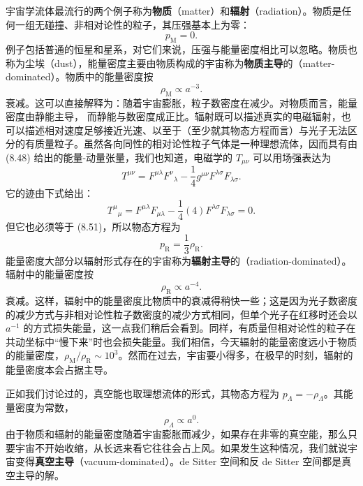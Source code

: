 宇宙学流体最流行的两个例子称为\textbf{物质}（matter）和\textbf{辐射}（radiation）。物质是任何一组无碰撞、非相对论性的粒子，其压强基本上为零：
\begin{equation*}
p_{\mathrm{M}} = 0.
\tag{8.57}
\end{equation*}
例子包括普通的恒星和星系，对它们来说，压强与能量密度相比可以忽略。物质也称为尘埃（dust），能量密度主要由物质构成的宇宙称为\textbf{物质主导}的（matter-dominated）。物质中的能量密度按
\begin{equation*}
\rho_{\mathrm{M}} \propto a^{-3}.
\tag{8.58}
\end{equation*}
衰减。这可以直接解释为：随着宇宙膨胀，粒子数密度在减少。对物质而言，能量密度由静能主导，
而静能与数密度成正比。辐射既可以描述真实的电磁辐射，也可以描述相对速度足够接近光速、以至于（至少就其物态方程而言）与光子无法区分的有质量粒子。虽然各向同性的相对论性粒子气体是一种理想流体，因而具有由 (8.48) 给出的能量-动量张量，我们也知道，电磁学的 $T_{\mu\nu}$ 可以用场强表达为
\begin{equation*}
T^{\mu\nu} = F^{\mu\lambda}F^{\nu}{}_{\lambda} - \frac{1}{4}g^{\mu\nu}F^{\lambda\sigma}F_{\lambda\sigma}.
\tag{8.59}
\end{equation*}
它的迹由下式给出：
\begin{equation*}
T^\mu{}_\mu = F^{\mu\lambda}F_{\mu\lambda} - \frac{1}{4}(4)F^{\lambda\sigma}F_{\lambda\sigma} = 0.
\tag{8.60}
\end{equation*}
但它也必须等于 (8.51)，所以物态方程为
\begin{equation*}
p_{\mathrm{R}} = \frac{1}{3}\rho_{\mathrm{R}}.
\tag{8.61}
\end{equation*}
能量密度大部分以辐射形式存在的宇宙称为\textbf{辐射主导}的（radiation-dominated）。辐射中的能量密度按
\begin{equation*}
\rho_{\mathrm{R}} \propto a^{-4}.
\tag{8.62}
\end{equation*}
衰减。这样，辐射中的能量密度比物质中的衰减得稍快一些；这是因为光子数密度的减少方式与非相对论性粒子数密度的减少方式相同，但单个光子在红移时还会以 $a^{-1}$ 的方式损失能量，这一点我们稍后会看到。同样，有质量但相对论性的粒子在共动坐标中“慢下来”时也会损失能量。我们相信，今天辐射的能量密度远小于物质的能量密度，$\rho_{\mathrm{M}}/\rho_{\mathrm{R}}\sim 10^{3}$。然而在过去，宇宙要小得多，在极早的时刻，辐射的能量密度本会占据主导。

正如我们讨论过的，真空能也取理想流体的形式，其物态方程为 $p_{\Lambda}=-\rho_{\Lambda}$。其能量密度为常数，
\begin{equation*}
\rho_{\Lambda} \propto a^{0}.
\tag{8.63}
\end{equation*}
由于物质和辐射的能量密度随着宇宙膨胀而减少，如果存在非零的真空能，那么只要宇宙不开始收缩，从长远来看它往往会占上风。如果发生这种情况，我们就说宇宙变得\textbf{真空主导}（vacuum-dominated）。de Sitter 空间和反 de Sitter 空间都是真空主导的解。

